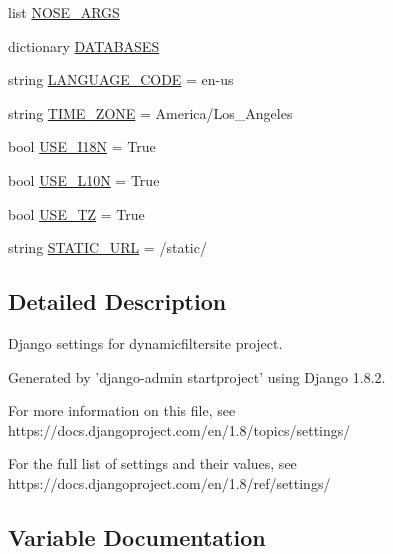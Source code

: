 \begin{DoxyCompactItemize}
\item 
list \hyperlink{namespacedynamicfiltersite_1_1settings_a4b4f0b801c1d1b0fee67c8f45391ffb1}{N\+O\+S\+E\+\_\+\+A\+R\+GS}
\item 
dictionary \hyperlink{namespacedynamicfiltersite_1_1settings_a231cae2a3420dacff7b58a500c6b9555}{D\+A\+T\+A\+B\+A\+S\+ES}
\item 
string \hyperlink{namespacedynamicfiltersite_1_1settings_a85bdb273c38bd7f0a06a3a38aa81225c}{L\+A\+N\+G\+U\+A\+G\+E\+\_\+\+C\+O\+DE} = \textquotesingle{}en-\/us\textquotesingle{}
\item 
string \hyperlink{namespacedynamicfiltersite_1_1settings_a037ffded91b7904e73dda92d116594c6}{T\+I\+M\+E\+\_\+\+Z\+O\+NE} = \textquotesingle{}America/Los\+\_\+\+Angeles\textquotesingle{}
\item 
bool \hyperlink{namespacedynamicfiltersite_1_1settings_aa385f7186a262f3a197d89b86cd5b44f}{U\+S\+E\+\_\+\+I18N} = True
\item 
bool \hyperlink{namespacedynamicfiltersite_1_1settings_a2578e043379f868f8693d8299d915972}{U\+S\+E\+\_\+\+L10N} = True
\item 
bool \hyperlink{namespacedynamicfiltersite_1_1settings_a1ad6572b69b47cfda1778bf6e9cb6343}{U\+S\+E\+\_\+\+TZ} = True
\item 
string \hyperlink{namespacedynamicfiltersite_1_1settings_a428f2ec992bf4fd72c3c6344615535b0}{S\+T\+A\+T\+I\+C\+\_\+\+U\+RL} = \textquotesingle{}/static/\textquotesingle{}
\end{DoxyCompactItemize}


\subsection{Detailed Description}
\begin{DoxyVerb}Django settings for dynamicfiltersite project.

Generated by 'django-admin startproject' using Django 1.8.2.

For more information on this file, see
https://docs.djangoproject.com/en/1.8/topics/settings/

For the full list of settings and their values, see
https://docs.djangoproject.com/en/1.8/ref/settings/
\end{DoxyVerb}
 

\subsection{Variable Documentation}
\mbox{\label{namespacedynamicfiltersite_1_1settings_a1c65930ce3d00aea720781bc9c17b0b8}} 

